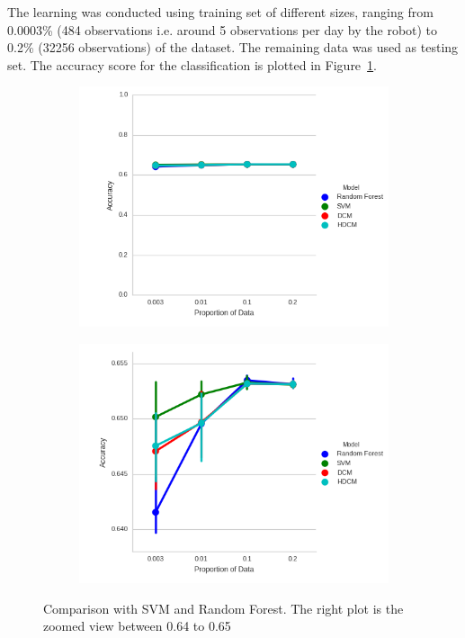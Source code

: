 The learning was conducted using training set of different sizes, ranging from 0.0003\% (484 observations i.e. around 5 observations per day by the robot) to 0.2\% (32256 observations) of the dataset. The remaining data was used as testing set. The accuracy score for the classification is plotted in Figure~\ref{fig:SVM_vs_DCM}. 

\begin{figure}
    \centering
    \begin{subfigure}[b]{0.44\textwidth}
        \includegraphics[width=\textwidth]{images/svm_vs_HDCM.png}
    \end{subfigure}
    \begin{subfigure}[b]{0.44\textwidth}
        \includegraphics[width=\textwidth]{images/svm_vs_HDCM_zoomed.png}       
    \end{subfigure}
    
    \caption[Comparison with SVM and Random Forest]{ Comparison with SVM and Random Forest. The right plot is the zoomed view between 0.64 to 0.65}
    \label{fig:SVM_vs_DCM}
\end{figure}

